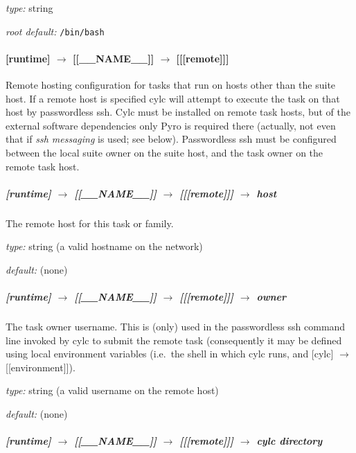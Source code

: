 \begin{myitemize}
\item {\em type:} string
\item {\em root default:} \lstinline=/bin/bash= 
\end{myitemize}


\paragraph[{[[[}remote{]]]}]{[runtime] $\rightarrow$ [[\_\_NAME\_\_]] $\rightarrow$ [[[remote]]]}

Remote hosting configuration for tasks that run on hosts other than the
suite host. If a remote host is specified cylc will attempt to execute
the task on that host by passwordless ssh. Cylc must be installed on 
remote task hosts, but of the external software dependencies only Pyro 
is required there (actually, not even that if {\em ssh messaging} is
used; see below). Passwordless ssh must be configured between the local
suite owner on the suite host, and the task owner on the remote task
host.

\subparagraph[host]{[runtime] $\rightarrow$ [[\_\_NAME\_\_]] $\rightarrow$ [[[remote]]] $\rightarrow$ host}

The remote host for this task or family.

\begin{myitemize}
\item {\em type:} string (a valid hostname on the network)
\item {\em default:} (none)
\end{myitemize}

\subparagraph[owner]{[runtime] $\rightarrow$ [[\_\_NAME\_\_]] $\rightarrow$ [[[remote]]] $\rightarrow$ owner}

The task owner username. This is (only) used in the passwordless ssh
command line  invoked by cylc to submit the remote task (consequently it
may be defined using local environment variables 
(i.e.\ the shell in which cylc runs, and [cylc] $\rightarrow$ [[environment]]). 

\begin{myitemize}
\item {\em type:} string (a valid username on the remote host)
\item {\em default:} (none)
\end{myitemize}

\subparagraph[cylc directory]{[runtime] $\rightarrow$ [[\_\_NAME\_\_]] $\rightarrow$ [[[remote]]] $\rightarrow$ cylc directory}

